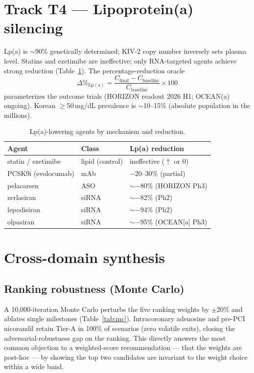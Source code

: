 \documentclass[11pt]{article}
\begin{document}
\section{Track T4 --- Lipoprotein(a) silencing}
\label{sec:lpa}

Lp(a) is $\sim$90\% genetically determined; KIV-2 copy number inversely sets plasma level. Statins and ezetimibe are ineffective; only RNA-targeted agents achieve strong reduction (Table~\ref{tab:lpa}). The percentage-reduction oracle
\begin{equation}
\Delta\%_{\mathrm{Lp(a)}} = \frac{C_{\mathrm{final}} - C_{\mathrm{baseline}}}{C_{\mathrm{baseline}}}\times 100
\label{eq:ldlpct}
\end{equation}
parameterizes the outcome trials (HORIZON readout 2026 H1; OCEAN(a) ongoing). Korean $\geq$50\,mg/dL prevalence is $\sim$10--15\% (absolute population in the millions).

\begin{table}[h]
\centering
\caption{Lp(a)-lowering agents by mechanism and reduction.}
\label{tab:lpa}
\begin{tabular}{lll}
\toprule
Agent & Class & Lp(a) reduction \\
\midrule
statin / ezetimibe & lipid (control) & ineffective ($\uparrow$ or 0) \\
PCSK9i (evolocumab) & mAb & $-$20--30\% (partial) \\
pelacarsen & ASO & $\sim-$80\% (HORIZON Ph3) \\
zerlasiran & siRNA & $\sim-$82\% (Ph2) \\
lepodisiran & siRNA & $\sim-$94\% (Ph2) \\
olpasiran & siRNA & $\sim-$95\% (OCEAN[a] Ph3) \\
\bottomrule
\end{tabular}
\end{table}

\section{Cross-domain synthesis}
\label{sec:synthesis}

\subsection{Ranking robustness (Monte Carlo)}
A 10{,}000-iteration Monte Carlo perturbs the five ranking weights by $\pm$20\% and ablates single milestones (Table~\ref{tab:mc}). Intracoronary adenosine and pre-PCI nicorandil retain Tier-A in 100\% of scenarios (zero volatile exits), closing the adversarial-robustness gap on the ranking. This directly answers the most common objection to a weighted-score recommendation --- that the weights are post-hoc --- by showing the top two candidates are invariant to the weight choice within a wide band.
\end{document}
